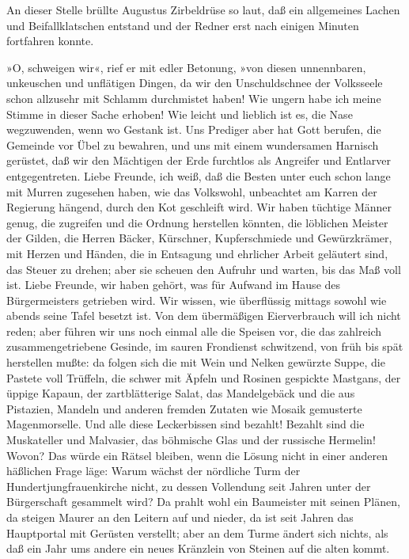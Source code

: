 An dieser Stelle brüllte Augustus Zirbeldrüse so laut, daß ein
allgemeines Lachen und Beifallklatschen entstand und der Redner
erst nach einigen Minuten fortfahren konnte.

»O, schweigen wir«, rief er mit edler Betonung, »von diesen
unnennbaren, unkeuschen und unflätigen Dingen, da wir den
Unschuldschnee der Volksseele schon allzusehr mit Schlamm
durchmistet haben! Wie ungern habe ich meine Stimme in dieser Sache
erhoben! Wie leicht und lieblich ist es, die Nase wegzuwenden, wenn
wo Gestank ist. Uns Prediger aber hat Gott berufen, die Gemeinde
vor Übel zu bewahren, und uns mit einem wundersamen Harnisch
gerüstet, daß wir den Mächtigen der Erde furchtlos als Angreifer
und Entlarver entgegentreten. Liebe Freunde, ich weiß, daß die
Besten unter euch schon lange mit Murren zugesehen haben, wie das
Volkswohl, unbeachtet am Karren der Regierung hängend, durch den
Kot geschleift wird. Wir haben tüchtige \pagenum{[35]} Männer
genug, die zugreifen und die Ordnung herstellen könnten, die
löblichen Meister der Gilden, die Herren Bäcker, Kürschner,
Kupferschmiede und Gewürzkrämer, mit Herzen und Händen, die in
Entsagung und ehrlicher Arbeit geläutert sind, das Steuer zu
drehen; aber sie scheuen den Aufruhr und warten, bis das Maß voll
ist. Liebe Freunde, wir haben gehört, was für Aufwand im Hause des
Bürgermeisters getrieben wird. Wir wissen, wie überflüssig mittags
sowohl wie abends seine Tafel besetzt ist. Von dem übermäßigen
Eierverbrauch will ich nicht reden; aber führen wir uns noch einmal
alle die Speisen vor, die das zahlreich zusammengetriebene Gesinde,
im sauren Frondienst schwitzend, von früh bis spät herstellen
mußte: da folgen sich die mit Wein und Nelken gewürzte Suppe, die
Pastete voll Trüffeln, die schwer mit Äpfeln und Rosinen gespickte
Mastgans, der üppige Kapaun, der zartblätterige Salat, das
Mandelgebäck und die aus Pistazien, Mandeln und anderen fremden
Zutaten wie Mosaik gemusterte Magenmorselle. Und alle diese
Leckerbissen sind bezahlt! Bezahlt sind die Muskateller und
Malvasier, das böhmische Glas und der russische Hermelin! Wovon?
Das würde ein Rätsel bleiben, wenn die Lösung nicht in einer
anderen häßlichen Frage läge: Warum wächst der nördliche Turm der
Hundertjungfrauenkirche nicht, zu dessen Vollendung seit Jahren
unter der Bürgerschaft gesammelt wird? Da prahlt wohl ein
Baumeister mit seinen Plänen, da steigen Maurer an den Leitern auf
und nieder, da ist seit Jahren das Hauptportal mit Gerüsten
verstellt; aber an dem Turme ändert sich nichts, als daß ein Jahr
ums andere ein neues Kränzlein von Steinen auf die alten kommt.
